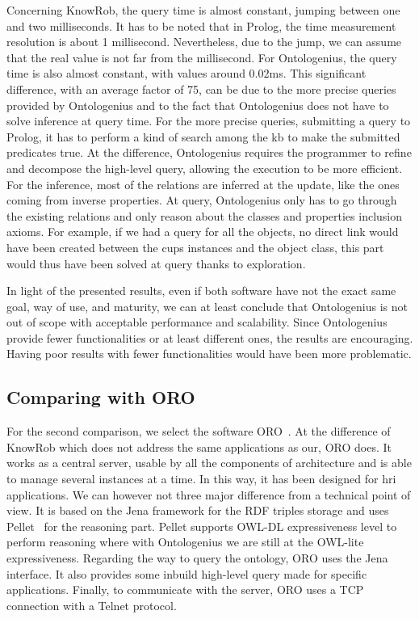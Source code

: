 Concerning KnowRob, the query time is almost constant, jumping between one and two milliseconds. It has to be noted that in Prolog, the time measurement resolution is about 1 millisecond. Nevertheless, due to the jump, we can assume that the real value is not far from the millisecond. For Ontologenius, the query time is also almost constant, with values around 0.02ms. This significant difference, with an average factor of 75, can be due to the more precise queries provided by Ontologenius and to the fact that Ontologenius does not have to solve inference at query time. For the more precise queries, submitting a query to Prolog, it has to perform a kind of search among the \acrshort{kb} to make the submitted predicates true. At the difference, Ontologenius requires the programmer to refine and decompose the high-level query, allowing the execution to be more efficient. For the inference, most of the relations are inferred at the update, like the ones coming from inverse properties. At query, Ontologenius only has to go through the existing relations and only reason about the classes and properties inclusion axioms. For example, if we had a query for all the objects, no direct link would have been created between the cups instances and the object class, this part would thus have been solved at query thanks to exploration.

In light of the presented results, even if both software have not the exact same goal, way of use, and maturity, we can at least conclude that Ontologenius is not out of scope with acceptable performance and scalability. Since Ontologenius provide fewer functionalities or at least different ones, the results are encouraging. Having poor results with fewer functionalities would have been more problematic.

\subsection{Comparing with ORO}

For the second comparison, we select the software ORO~\cite{lemaignan_2010_oro}. At the difference of KnowRob which does not address the same applications as our, ORO does. It works as a central server, usable by all the components of architecture and is able to manage several instances at a time. In this way, it has been designed for \acrshort{hri} applications. We can however not three major difference from a technical point of view. It is based on the Jena framework for the RDF triples storage and uses Pellet~\cite{sirin_2007_pellet} for the reasoning part. Pellet supports OWL-DL expressiveness level to perform reasoning where with Ontologenius we are still at the OWL-lite expressiveness. Regarding the way to query the ontology, ORO uses the Jena \sparql{} interface. It also provides some inbuild high-level query made for specific applications. Finally, to communicate with the server, ORO uses a TCP connection with a Telnet protocol.

